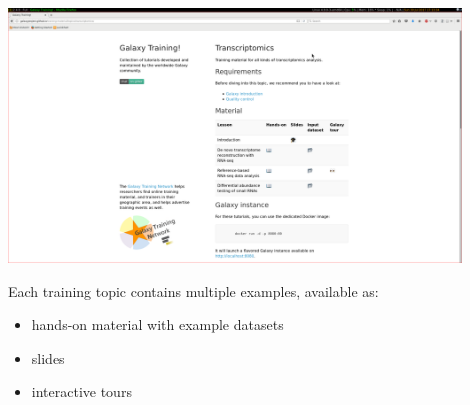 \documentclass[xcolor=dvipsnames]{beamer}
\begin{document}
\begin{frame}
  \frametitle{\three}
  \begin{center}
    \includegraphics[width=0.90\textwidth]{images/screenshot_usegalaxy_training}
  \end{center}
  \vspace{-0.3cm}
  Each training topic contains multiple examples, available as:
  \begin{itemize}
    \item hands-on material with example datasets
    \item slides
    \item interactive tours
  \end{itemize}
\end{frame}
\end{document}
